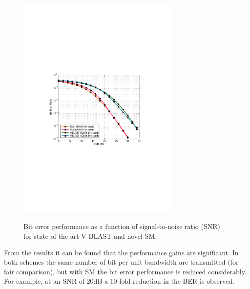 \begin{figure}[!!htp]\centering
  \includegraphics[width=8cm]{haas_2.pdf}\\
  \caption{Bit error performance as a function of signal-to-noise ratio (SNR) for state-of-the-art V-BLAST and novel SM.}
  \label{fig55}
\end{figure}
From the results it can be found that the performance gains are
significant. In both schemes the same number of bit per unit bandwidth
are transmitted (for fair comparison), but with SM the bit error performance is reduced
considerably. For example, at an SNR of 20dB a 10-fold reduction in
the BER is observed.\\

